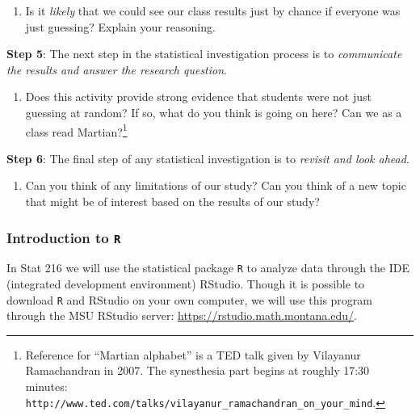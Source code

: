 \documentclass[
]{report}
\providecommand{\tightlist}{%
  \setlength{\itemsep}{0pt}\setlength{\parskip}{0pt}}
\begin{document}
\vspace{.5in}

\begin{enumerate}
\def\labelenumi{\arabic{enumi}.}
\setcounter{enumi}{16}
\tightlist
\item
  Is it \emph{likely} that we could see our class results just by chance if everyone was just guessing? Explain your reasoning.
\end{enumerate}

\vspace{.5in}

\textbf{Step 5}: The next step in the statistical investigation process is to \emph{communicate the results and answer the research question}.

\begin{enumerate}
\def\labelenumi{\arabic{enumi}.}
\setcounter{enumi}{17}
\tightlist
\item
  Does this activity provide strong evidence that students were not just guessing at random? If so, what do you think is going on here? Can we as a class read Martian?\footnote{Reference for ``Martian alphabet'' is a TED talk given by Vilayanur Ramachandran in 2007. The synesthesia part begins at roughly 17:30 minutes: \texttt{http://www.ted.com/talks/vilayanur\_ramachandran\_on\_your\_mind}.}
\end{enumerate}

\vspace{1in}

\textbf{Step 6}: The final step of any statistical investigation is to \emph{revisit and look ahead}.

\begin{enumerate}
\def\labelenumi{\arabic{enumi}.}
\setcounter{enumi}{18}
\tightlist
\item
  Can you think of any limitations of our study? Can you think of a new topic that might be of interest based on the results of our study?
\end{enumerate}

\vspace{1in}

\newpage

\hypertarget{introduction-to-r}{%
\subsubsection{\texorpdfstring{Introduction to \texttt{R}}{Introduction to R}}\label{introduction-to-r}}

In Stat 216 we will use the statistical package \texttt{R} to analyze data through the IDE (integrated development environment) RStudio. Though it is possible to download \texttt{R} and RStudio on your own computer, we will use this program through the MSU RStudio server: \url{https://rstudio.math.montana.edu/}.
\end{document}
